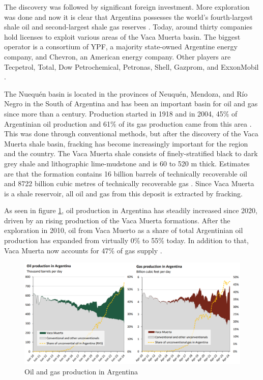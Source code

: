 The discovery was followed by significant foreign investment. More exploration was done and now it is clear that Argentina possesses the world’s fourth-largest shale oil and second-largest shale gas reserves \autocite{internationaltradeadministrationArgentinaCountryCommercial2025}. Today, around thirty companies hold licenses to exploit various areas of the Vaca Muerta basin. The biggest operator is a consortium of YPF, a majority state-owned Argentine energy company, and Chevron, an American energy company. Other players are Tecpetrol, Total, Dow Petrochemical, Petronas, Shell, Gazprom, and ExxonMobil \autocite{fogliaSedArena2023}.

The Nuequén basin is located in the provinces of Neuquén, Mendoza, and Río Negro in the South of Argentina and has been an important basin for oil and gas since more than a century. Production started in 1918 and in 2004, 45\% of Argentinian oil production and 61\% of its gas production came from this area \autocite{u.s.energyinformationadministrationTechnicallyRecoverableShale2013}. This was done through conventional methods, but after the discovery of the Vaca Muerta shale basin, fracking has become increasingly important for the region and the country. The Vaca Muerta shale consists of finely-stratified black to dark grey shale and lithographic lime-mudstone and is 60 to 520 m thick. Estimates are that the formation contains 16 billion barrels of technically recoverable oil and 8722 billion cubic metres of technically recoverable gas \autocite{u.s.energyinformationadministrationTechnicallyRecoverableShale2013}. Since Vaca Muerta is a shale reservoir, all oil and gas from this deposit is extracted by fracking.

As seen in figure \ref{fig:oilgasprod}, oil production in Argentina has steadily increased since 2020, driven by an rising production of the Vaca Muerta formations. After the exploration in 2010, oil from Vaca Muerto as a share of total Argentinian oil production has expanded from virtually 0\% to 55\% today. In addition to that, Vaca Muerta now accounts for 47\% of gas supply \autocite{internationaltradeadministrationArgentinaCountryCommercial2025}.

\begin{figure}[H]
    \centering
    \includegraphics[width=1\linewidth]{figures/ch9/oilgasproduction.png}
    \caption{Oil and gas production in Argentina \autocite{internationaltradeadministrationArgentinaCountryCommercial2025}}
    \label{fig:oilgasprod}
\end{figure}

